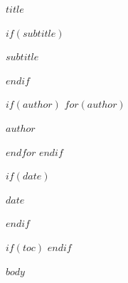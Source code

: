 \documentclass[$if(fontsize)$$fontsize$$else$12pt$endif$]{article}
\begin{document}
\thispagestyle{firstpage}
\pagestyle{otherpages}

\afterpage{\restoregeometry}

\vspace*{0.7cm}

{\LARGE\bfseries $title$\par}

$if(subtitle)$
\vspace{0.5em}
{\large $subtitle$\par}
$endif$

$if(author)$
\vspace{1em}
$for(author)$
{$author$\par}
$endfor$
$endif$

$if(date)$
\vspace{0.5em}
{$date$\par}
$endif$

$if(toc)$
\setcounter{page}{1}
\tableofcontents
$endif$

$body$
\end{document}
